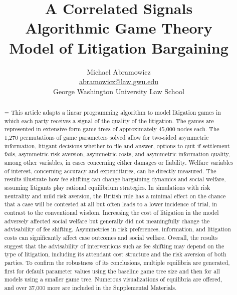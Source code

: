 \documentclass{article}
\newenvironment{nohyphen}
  {\tolerance=1%
   \emergencystretch=\maxdimen%
   \hyphenpenalty=10000%
   \hbadness=10000}%
  {\par}%
\begin{document}
\title{A Correlated Signals \\ Algorithmic Game Theory \\ Model of Litigation Bargaining}
\author{Michael Abramowicz \\ \href{mailto:abramowicz@law.gwu.edu}{abramowicz@law.gwu.edu} \\ George Washington University Law School}

\maketitle

\begin{abstract}
\begin{nohyphen}
This article adapts a linear programming algorithm to model litigation games in which each party receives a signal of the quality of the litigation. The games are represented in extensive-form game trees of approximately 45,000 nodes each. The 1,270 permutations of game parameters solved allow for two-sided asymmetric information, litigant decisions whether to file and answer, options to quit if settlement fails, asymmetric risk aversion, asymmetric costs, and asymmetric information quality, among other variables, in cases concerning either damages or liability. Welfare variables of interest, concerning accuracy and expenditures, can be directly measured. The results illustrate how fee shifting can change bargaining dynamics and social welfare, assuming litigants play rational equilibrium strategies. In simulations with risk neutrality and mild risk aversion, the British rule has a minimal effect on the chance that a case will be contested at all but often leads to a lower incidence of trial, in contrast to the conventional wisdom. Increasing the cost of litigation in the model adversely affected social welfare but generally did not meaningfully change the advisability of fee shifting. Asymmetries in risk preferences, information, and litigation costs can significantly affect case outcomes and social welfare. Overall, the results suggest that the advisability of interventions such as fee shifting may depend on the type of litigation, including its attendant cost structure and the risk aversion of both parties. To confirm the robustness of its conclusions, multiple equilibria are generated, first for default parameter values using the baseline game tree size and then for all models using a smaller game tree. Numerous visualizations of equilibria are offered, and over 37,000 more are included in the Supplemental Materials. 
\end{nohyphen}
\end{abstract}
\end{document}
